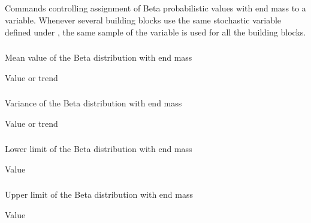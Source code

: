 {\subsection{}
 \slist
   \item \Description Commands controlling assignment of Beta probabilistic values with end mass to a variable. Whenever several building blocks use the same stochastic variable defined under , the same sample of the variable is used for all the building blocks. 
   \item \Argument
   \item \Default 
 \elist

\subsubsection{}
 \slist
   \item \Description Mean value of the Beta distribution with end mass
   \item \Argument Value or trend
   \item \Default 
 \elist

\subsubsection{}
 \slist
   \item \Description Variance of the Beta distribution with end mass
   \item \Argument Value or trend
   \item \Default 
 \elist

\subsubsection{}
 \slist
   \item \Description Lower limit of the Beta distribution with end mass
   \item \Argument Value
   \item {}
 \elist

\subsubsection{}
 \slist
   \item \Description Upper limit of the Beta distribution with end mass
   \item \Argument Value
   \item {}
 \elist

}
